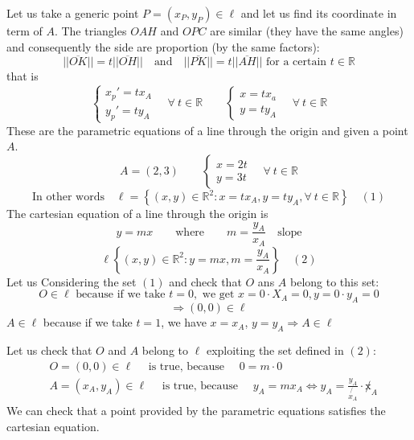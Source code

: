 Let us take a generic point $P=(x_P, y_P)\in \ell$ and let us find its coordinate in term of $A$. The triangles $OAH$ and $OPC$ are similar (they have the same angles) and consequently the side are proportion (by the same factors):
$$||\overline{OK}|| = t||\overline{OH}|| \quad \text{and} \quad  ||\overline{PK}|| = t ||\overline{AH}|| \text{ for a certain } t \in \mathbb{R}$$
that is
$$\begin{cases}
    x_p' =t x_A\\
    y_p' = ty_A
\end{cases} \quad \forall \ t \in \mathbb{R} \qquad \begin{cases}
    x = tx_a\\
    y= ty_A
\end{cases} \quad \forall \ t \in \mathbb{R}$$
These are the parametric equations of a line through the origin and given a point $A$. 
$$A = (2,3) \qquad \begin{cases}
     x= 2t \\
    y = 3t
\end{cases} \quad \forall \ t \in\mathbb{R}$$
$$\text{In other words} \quad \ell = \left\{ (x,y) \in \mathbb{R}^2: x=tx_A, y=ty_A, \forall \ t \in \mathbb{R} \right\} \quad (1)$$
The cartesian equation of a line through the origin is 
$$y = mx \qquad \text{where} \qquad m = \frac{y_A}{x_A} \quad \text{slope}$$
$$\ell \left\{ (x,y) \in \mathbb{R}^2 : y = mx, m=\frac{y_A}{x_A} \right\} \quad (2)$$
Let us Considering the set $(1)$ and check that $O$ ans $A$ belong to this set:
$$O \in \ell \text{ because if we take } t=0, \text{ we get } x = 0 \cdot X_A= 0, y = 0\cdot y_A = 0 
$$
$$\Rightarrow (0,0) \in \ell$$
$A \in \ell$ because if we take $t=1$, we have $x=x_A$, $y=y_A \Rightarrow A \in \ell$

Let us check that $O$ and $A$ belong to $   \ell$ exploiting the set defined in $(2)$:
\begin{align*}
    &O = (0,0) \in \ell \quad\text{ is true, because } \quad 0 = m\cdot 0\\
    &A= (x_A, y_A) \in \ell \quad \text{ is true, because } \quad y_A = mx_A \Leftrightarrow y_A = \frac{y_A}{\not{ x_A}} \cdot \not x_A
\end{align*}
We can check that a point provided by the parametric equations satisfies the cartesian equation. 

